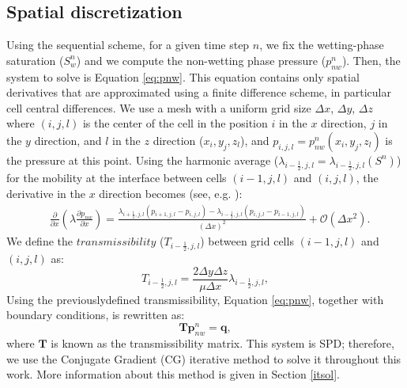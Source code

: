 \documentclass[12pt]{article}
\begin{document}
 \subsection*{Spatial discretization}
\hspace{0.5cm} Using the sequential scheme, for a given time step $n$, we fix the wetting-phase saturation ($S_w^n$) and we 
compute the non-wetting phase pressure ($p_{nw}^n$). Then, the system to solve is Equation \eqref{eq:pnw}. This equation contains 
only spatial derivatives that are approximated using a finite difference scheme, in particular cell central differences. 
We use a mesh with a uniform grid size $\Delta x$, $\Delta y$, $\Delta z$ where $(i,j,l)$ is the center 
of the cell in the position $i$ in the $x$ direction, $j$ in the $y$ direction, and $l$ in the $z$ direction ($x_i,y_j,z_l$), 
and $p_{i,j,l}=p_{nw}^n(x_i,y_j,z_l)$ is the pressure at this point.
Using the harmonic average ($\lambda _{i-\frac{1}{2},j,l}=\lambda _{i-\frac{1}{2},j,l}(S^n)$) for the mobility at the interface 
between cells 
$(i-1,j,l)$ and $(i,j,l)$, the derivative in the $x$ direction becomes (see, e.g. \cite{Aziz79,Chen06,Jansen13, Diaz16}):
\begin{align*}
&\frac{\partial}{\partial x}\left(\lambda \frac{\partial p_{nw}}{\partial x}\right) = \frac{ \lambda _{i+\frac{1}{2},j,l}(p_{i+1,j,l}-p_{i,j,l})-\lambda _{i-\frac{1}{2},j,l}(p_{i,j,l}-p_{i-1,j,l})}{\left( \Delta x\right)^2}+\mathscr{O}(\Delta x^2).
\end{align*}
We define the $transmissibility$ ($T_{i-\frac{1}{2},j,l}$) between grid cells $(i-1,j,l)$ and $(i,j,l)$ as:
\begin{equation}\label{eq:htrans}
 T_{i-\frac{1}{2},j,l}=\frac{2\Delta y \Delta z}{\mu\Delta x}
 \lambda_{i-\frac{1}{2},j,l},
\end{equation}  
Using the previouslydefined transmissibility, Equation \eqref{eq:pnw}, together with boundary conditions, is rewritten as:
 \begin{equation}\label{eq:cel1}
\mathbf{T}\mathbf{p}^n_{nw} = \mathbf{q},
\end{equation}
where $\mathbf{T}$ is known as the transmissibility matrix. This system is SPD; therefore, we use the Conjugate Gradient (CG) 
iterative method to solve it throughout this work. More information about this method is given in Section \ref{itsol}.\par
\end{document}
